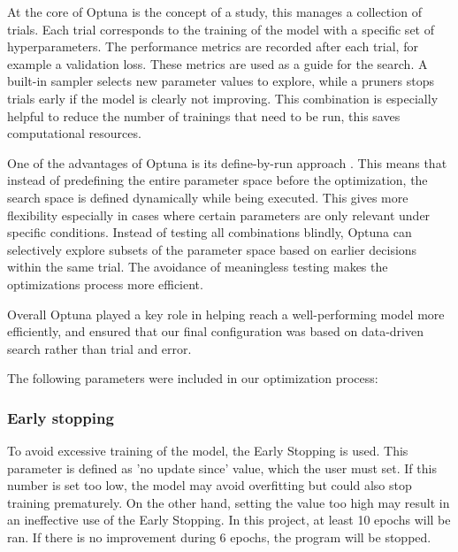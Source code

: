 \documentclass[twocolumn]{article}
\begin{document}
At the core of Optuna is the concept of a study, this manages a collection of trials. 
Each trial corresponds to the training of the model with a specific set of hyperparameters. 
The performance metrics are recorded after each trial, for example a validation loss. These metrics are used as a guide for the search. 
A built-in sampler selects new parameter values to explore, while a pruners stops trials early if the model is clearly not improving. 
This combination is especially helpful to reduce the number of trainings that need to be run, this saves computational resources. 

One of the advantages of Optuna is its define-by-run approach \cite{10.1145/3292500.3330701}. 
This means that instead of predefining the entire parameter space before the optimization, the search space is defined dynamically while being executed. 
This gives more flexibility especially in cases where certain parameters are only relevant under specific conditions. 
Instead of testing all combinations blindly, Optuna can selectively explore subsets of the parameter space based on earlier decisions within the same trial. 
The avoidance of meaningless testing makes the optimizations process  more efficient. 

Overall Optuna played a key role in helping reach a well-performing model more efficiently, and ensured that our final configuration was based on data-driven search rather than trial and error.

The following parameters were included in our optimization process:

\subsubsection{Early stopping}
To avoid excessive training of the model, the Early Stopping is used. 
This parameter is defined as 'no update since' value, which the user must set. 
If this number is set too low, the model may avoid overfitting but could also stop training prematurely. 
On the other hand, setting the value too high may result in an ineffective use of the Early Stopping. 
In this project, at least 10 epochs will be ran. If there is no improvement during 6 epochs, the program will be stopped.
\end{document}
